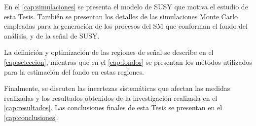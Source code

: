 En el \cref{cap:simulaciones} se presenta el modelo de SUSY que motiva el
estudio de esta Tesis. También se presentan los detalles de las simulaciones
Monte Carlo empleadas para la generación de los procesos del SM que conforman el
fondo del análisis, y de la señal de SUSY.

La definición y optimización de las regiones de señal se describe en el
\cref{cap:seleccion}, mientras que en el \cref{cap:fondos} se presentan los
métodos utilizados para la estimación del fondo en estas regiones.

Finalmente, se discuten las incertezas sistemáticas que afectan las medidas
realizadas y los resultados obtenidos de la investigación realizada en el
\cref{cap:resultados}. Las conclusiones finales de esta Tesis se presentan en el
\cref{cap:conclusiones}.
